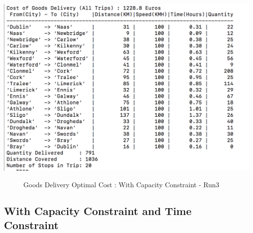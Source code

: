 \documentclass[a4paper&11pt]{article}
\begin{document}
\begin{center}
\includegraphics[scale=0.8]{20fig3.png}
\begin{figure}[H]
\caption{Goods Delivery Optimal Cost :  With Capacity Constraint - Run3}
\label{fig:20fig3}
\end{figure}
\end{center}

\subsection*{With Capacity Constraint and Time Constraint}
\end{document}
